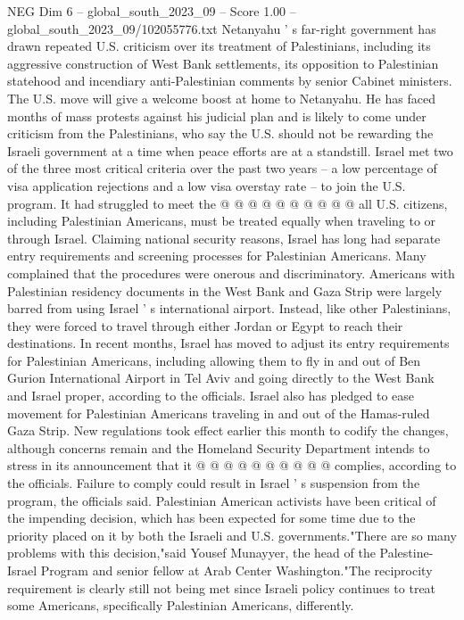 \begin{textsample}{NEG Dim 6 – global\_south\_2023\_09 – Score 1.00 – global\_south\_2023\_09/102055776.txt}
Netanyahu ' s far-right government has drawn repeated U.S. criticism over its treatment of Palestinians, including its aggressive construction of West Bank settlements, its opposition to Palestinian statehood and incendiary anti-Palestinian comments by senior Cabinet ministers.
The U.S. move will give a welcome boost at home to Netanyahu.
He has faced months of mass protests against his judicial plan and is likely to come under criticism from the Palestinians, who say the U.S. should not be rewarding the Israeli government at a time when peace efforts are at a standstill.
Israel met two of the three most critical criteria over the past two years -- a low percentage of visa application rejections and a low visa overstay rate -- to join the U.S. program.
It had struggled to meet the @ @ @ @ @ @ @ @ @ @ all U.S. citizens, including Palestinian Americans, must be treated equally when traveling to or through Israel.
Claiming national security reasons, Israel has long had separate entry requirements and screening processes for Palestinian Americans.
Many complained that the procedures were onerous and discriminatory.
Americans with Palestinian residency documents in the West Bank and Gaza Strip were largely barred from using Israel ' s international airport.
Instead, like other Palestinians, they were forced to travel through either Jordan or Egypt to reach their destinations.
In recent months, Israel has moved to adjust its entry requirements for Palestinian Americans, including allowing them to fly in and out of Ben Gurion International Airport in Tel Aviv and going directly to the West Bank and Israel proper, according to the officials.
Israel also has pledged to ease movement for Palestinian Americans traveling in and out of the Hamas-ruled Gaza Strip.
New regulations took effect earlier this month to codify the changes, although concerns remain and the Homeland Security Department intends to stress in its announcement that it @ @ @ @ @ @ @ @ @ @ complies, according to the officials.
Failure to comply could result in Israel ' s suspension from the program, the officials said.
Palestinian American activists have been critical of the impending decision, which has been expected for some time due to the priority placed on it by both the Israeli and U.S. governments."There are so many problems with this decision,"said Yousef Munayyer, the head of the Palestine-Israel Program and senior fellow at Arab Center Washington."The reciprocity requirement is clearly still not being met since Israeli policy continues to treat some Americans, specifically Palestinian Americans, differently.

\end{textsample}

